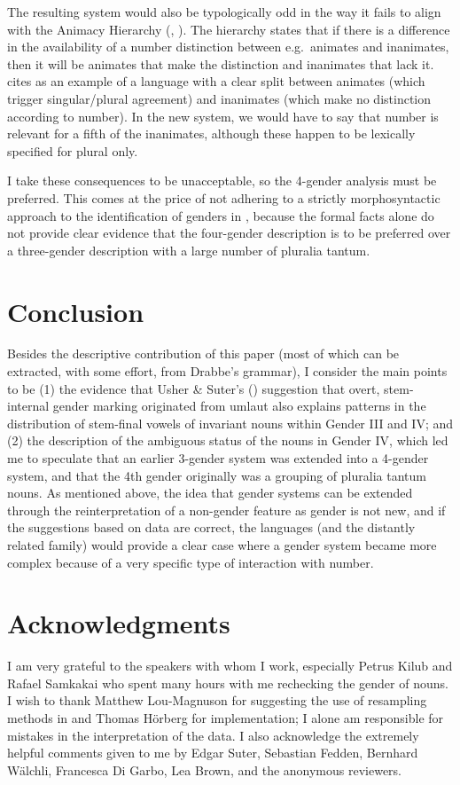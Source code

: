 \documentclass[output=collectionpaper]{langsci/langscibook}
\begin{document}
The resulting system would also be typologically odd in the way it fails to align with the Animacy Hierarchy (\citealt{Smith-Stark1974}, \citealt[55ff.]{Corbett2000}). The hierarchy states that if there is a difference in the availability of a number distinction between e.g.\ animates and inanimates, then it will be animates that make the distinction and inanimates that lack it. \citet[59]{Corbett2000} cites  as an example of a language with a clear split between animates (which trigger singular/plural agreement) and inanimates (which make no distinction according to number). In the new system, we would have to say that number is relevant for a fifth of the inanimates, although these happen to be lexically specified for plural only.

I take these consequences to be unacceptable, so the 4-gender analysis must be preferred. This comes at the price of not adhering to a strictly morphosyntactic approach to the identification of genders in , because the formal facts alone do not provide clear evidence that the four-gender description is to be preferred over a three-gender description with a large number of pluralia tantum.

\section{Conclusion}

Besides the descriptive contribution of this paper (most of which can be extracted, with some effort, from Drabbe's grammar), I consider the main points to be (1) the evidence that Usher \& Suter's (\citeyear{Usher2015}) suggestion that overt, stem-internal gender marking originated from umlaut also explains patterns in the distribution of stem-final vowels of invariant nouns within Gender III and IV; and (2) the description of the ambiguous status of the nouns in Gender IV, which led me to speculate that an earlier 3-gender system was extended into a 4-gender system, and that the 4th gender originally was a grouping of pluralia tantum nouns. As mentioned above, the idea that gender systems can be extended through the reinterpretation of a non-gender feature as gender is not new, and if the suggestions based on  data are correct, the  languages (and the distantly related  family) would provide a clear case where a gender system became more complex because of a very specific type of interaction with number.

\section*{Acknowledgments}
I am very grateful to the  speakers with whom I work, especially Petrus Kilub and Rafael Samkakai who spent many hours with me rechecking the gender of nouns. I wish to thank Matthew Lou-Magnuson for suggesting the use of resampling methods in  and Thomas H\"orberg for implementation; I alone am responsible for mistakes in the interpretation of the data. I also acknowledge the extremely helpful comments given to me by Edgar Suter, Sebastian Fedden, Bernhard Wälchli, Francesca Di Garbo, Lea Brown, and the anonymous reviewers.
\end{document}
